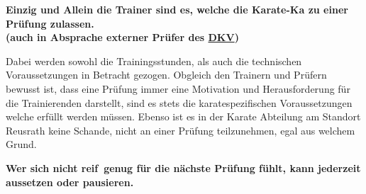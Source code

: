 		\begin{center}
			\textbf{Einzig und Allein die Trainer sind es, welche die Karate-Ka zu einer Prüfung zulassen.\\(auch in Absprache externer Prüfer des \href{https://www.karate.de/}{DKV})}
		\end{center}
		Dabei werden sowohl die Trainingsstunden, als auch die technischen Voraussetzungen in Betracht gezogen. Obgleich den Trainern und Prüfern bewusst ist, dass eine Prüfung immer eine Motivation und Herausforderung für die Trainierenden darstellt, sind es stets die karatespezifischen Voraussetzungen welche erfüllt werden müssen. Ebenso ist es in der Karate Abteilung am Standort Reusrath keine Schande, nicht an einer Prüfung teilzunehmen, egal aus welchem Grund.
		\begin{center}
			\textbf{Wer sich nicht \frqq reif\flqq~genug für die nächste Prüfung fühlt, kann jederzeit aussetzen oder pausieren.}
		\end{center}
